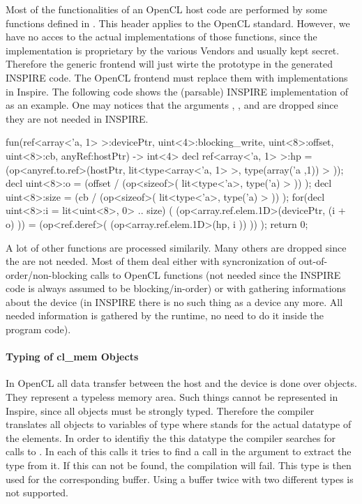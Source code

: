 Most of the functionalities of an OpenCL host code are performed by some functions defined in . This header applies to the OpenCL standard. However, we have no acces to the actual implementations of those functions, since the implementation is proprietary by the various Vendors and usually kept secret. Therefore the generic frontend will just wirte the prototype in the generated INSPIRE code. The OpenCL frontend must replace them with implementations in Inspire. The following code shows the (parsable) INSPIRE implementation of  as an example. One may notices that the arguments , , and  are dropped since they are not needed in INSPIRE. 
 
\label{lst:copyBuffer} 
\begin{irCode}
fun(ref<array<'a, 1> >:devicePtr, uint<4>:blocking_write, uint<8>:offset, uint<8>:cb, anyRef:hostPtr) -> int<4> {{ 
    decl ref<array<'a, 1> >:hp = (op<anyref.to.ref>(hostPtr, lit<type<array<'a, 1> >, type(array('a ,1)) > )); 
	decl uint<8>:o = (offset / (op<sizeof>( lit<type<'a>, type('a) > )) ); 
    decl uint<8>:size = (cb / (op<sizeof>( lit<type<'a>, type('a) > )) ); 
    for(decl uint<8>:i = lit<uint<8>, 0> .. size) 
        ( (op<array.ref.elem.1D>(devicePtr, (i + o) )) = (op<ref.deref>( (op<array.ref.elem.1D>(hp, i )) )) ); 
    return 0; 
}}
\end{irCode}

A lot of other functions are processed similarily. Many others are dropped since the are not needed. Most of them deal either with syncronization of out-of-order/non-blocking calls to OpenCL functions (not needed since the INSPIRE code is always assumed to be blocking/in-order) or with gathering informations about the device (in INSPIRE there is no such thing as a device any more. All needed information is gathered by the runtime, no need to do it inside the program code). 

\paragraph{Typing of cl\_mem Objects}

In OpenCL all data transfer between the host and the device is done over  objects. They represent a typeless memory area. Such things cannot be represented in Inspire, since all objects must be strongly typed. Therefore the compiler translates all  objects to variables of type  where  stands for the actual datatype of the elements. In order to identifiy the this datatype the compiler searches for calls to . In each of this calls it tries to find a  call in the  argument to extract the type from it. If this can not be found, the compilation will fail. This type is then used for the corresponding buffer. Using a buffer twice with two different types is not supported. 


